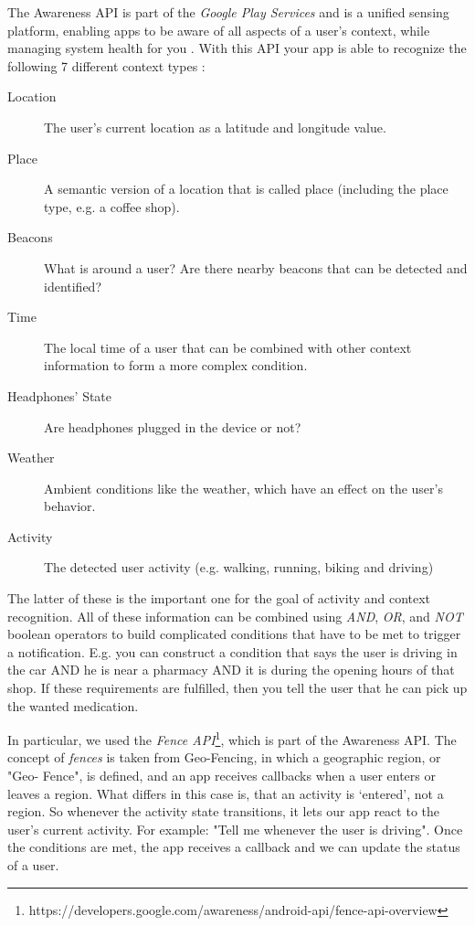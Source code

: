 \documentclass{sigchi}
\begin{document}
The Awareness API is part of the \textit{Google Play Services} and is a unified sensing platform, enabling apps to be aware of all aspects of a user's context, while managing system health for you \cite{you16}. With this API your app is able to recognize the following 7 different context types \cite{goo16}:
\begin{description}
\item[Location]
The user's current location as a latitude and longitude value.
\item[Place]
A semantic version of a location that is called place (including the place type, e.g. a coffee shop).
\item[Beacons]
What is around a user? Are there nearby beacons that can be detected and identified?
\item[Time]
The local time of a user that can be combined with other context information to form a more complex condition.
\item[Headphones' State]
Are headphones plugged in the device or not?
\item[Weather]
Ambient conditions like the weather, which have an effect on the user's behavior.
\item[Activity]
The detected user activity (e.g. walking, running, biking and driving)
\end{description}

The latter of these is the important one for the goal of activity and context recognition. All of these information can be combined using \textit{AND}, \textit{OR}, and \textit{NOT} boolean operators to build complicated conditions that have to be met to trigger a notification. E.g. you can construct a condition that says the user is driving in the car AND he is near a pharmacy AND it is during the opening hours of that shop. If these requirements are fulfilled, then you tell the user that he can pick up the wanted medication.

In particular, we used the \textit{Fence API}\footnote{https://developers.google.com/awareness/android-api/fence-api-overview}, which is part of the Awareness API. The concept of \textit{fences} is taken from Geo-Fencing, in which a geographic region, or "Geo- Fence", is defined, and an app receives callbacks when a user enters or leaves a region. What differs in this case is, that an activity is `entered', not a region. So whenever the activity state transitions, it lets our app react to the user's current activity. For example: "Tell me whenever the user is driving". Once the conditions are met, the app receives a callback and we can update the status of a user.
\end{document}
